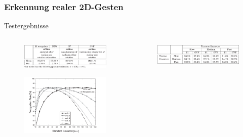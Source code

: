 \documentclass{beamer}
\begin{document}
\begin{frame}\frametitle{Erkennung realer 2D-Gesten}
Testergebnisse
\begin{columns}
\begin{column}{.5\textwidth}
\begin{figure}
\centering
\includegraphics[width=\linewidth]{../Bilder/Tabelle1cut}
\label{fig:Tabelle1}
\end{figure}
\begin{figure}
\centering
\includegraphics[width=\linewidth]{../Bilder/Fig4}
\label{fig:Fig4}
\end{figure}
\end{column}
\begin{column}{.5\textwidth}
\begin{figure}
\centering
\includegraphics[width=\linewidth]{../Bilder/Tabelle2cut}
\label{fig:Tabelle2}
\end{figure}
\begin{figure}
\centering

\end{figure}
\end{column}
\end{columns}
\end{frame}
\end{document}

